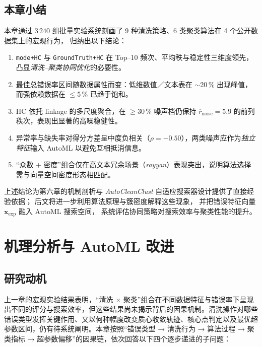 \documentclass[10pt]{article} %
\numberwithin{equation}{section}
\begin{document}
\subsection{\textcolor[rgb]{0.00,0.07,1.00}{本章小结}}

\textcolor[rgb]{0.00,0.07,1.00}{%
本章通过 \(3\,240\) 组批量实验系统刻画了 9 种清洗策略、6 类聚类算法在 4 个公开数据集上的宏观行为，
归纳出以下结论：}

\begin{enumerate}[label=\textbf{\arabic*.},leftmargin=2.4em]
  \item \texttt{mode+HC} 与 \texttt{GroundTruth+HC} 在 Top–10 频次、平均秩与稳定性三维度领先，凸显\emph{清洗–聚类协同优化}的必要性。%
  \item 最佳总错误率区间随数据属性而变：低维数值／文本表在 \(\sim\)20\,\% 出现峰值，而强依赖数据在 \(\le\)5\,\% 已趋于饱和。%
  \item HC 依托 linkage 的多尺度聚合，在 \(\ge\)30\,\% 噪声档仍保持 \(\overline{r}_{\text{noise}}=\num{5.9}\) 的前列秩次，表现出显著的高噪稳健性。%
  \item 异常率与缺失率对得分方差呈中度负相关（\(\rho=-0.50\)），两类噪声应作为\emph{独立特征}输入 AutoML 以避免互相抵消信息。%
  \item “众数 + 密度”组合仅在高文本冗余场景（\textit{rayyan}）表现突出，说明算法选择需与向量空间密度形态相匹配。%
\end{enumerate}

\textcolor[rgb]{0.00,0.07,1.00}{%
上述结论为第六章的机制剖析与 \emph{AutoCleanClust} 自适应搜索器设计提供了直接经验依据；
后文将进一步利用算法原理与簇密度解释这些现象，
并把错误特征向量 \(\mathbf{x}_{\text{exp}}\) 融入 AutoML 搜索空间，
系统评估协同策略对搜索效率与聚类性能的提升。}

\section{机理分析与 AutoML 改进}
\label{sec:chapter6}

\subsection{研究动机}
\label{sec:motivation}

\textcolor[rgb]{0.00,0.07,1.00}{上一章的宏观实验结果表明，“清洗 × 聚类”组合在不同数据特征与错误率下呈现出不同的评分与搜索效率，但这些结果尚未揭示背后的因果机制。清洗操作对哪些错误类型发挥关键作用、又以何种幅度改变质心收敛轨迹、核心点判定以及最优超参数区间，仍有待系统阐明。本章按照“错误类型 → 清洗行为 → 算法过程 → 聚类指标 → 超参数偏移”的因果链，依次回答以下四个逐步递进的子问题：}
\end{document}
